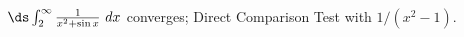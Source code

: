 {$\ds \int_{2}^\infty \frac{1}{x^2+\sin x} \ dx$}
{converges; Direct Comparison Test with $1/(x^2-1)$.}
